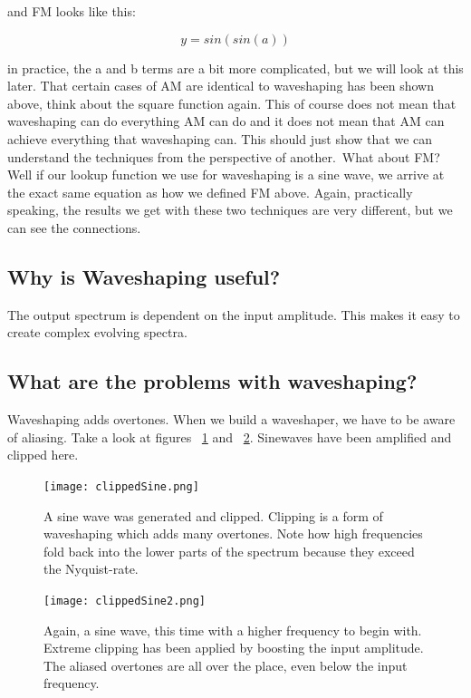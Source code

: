 and FM looks like this:

\begin{equation}
	y = sin(sin(a))
\end{equation}

in practice, the a and b terms are a bit more complicated, but we will look at this later. That certain cases of AM are identical to waveshaping has been shown above, think about the square function again.
This of course does not mean that waveshaping can do everything AM can do and it does not mean that AM can achieve everything that waveshaping can. This should just show that we can understand the techniques from the perspective of another.\
What about FM? Well if our lookup function we use for waveshaping is a sine wave, we arrive at the exact same equation as how we defined FM above. Again, practically speaking, the results we get with these two techniques are very different, but we can see the connections.


\subsection{Why is Waveshaping useful?}
The output spectrum is dependent on the input amplitude. This makes it easy to create complex evolving spectra.

\subsection{What are the problems with waveshaping?}

Waveshaping adds overtones. When we build a waveshaper, we have to be aware of aliasing. Take a look at figures ~\ref{fig:clipped1} and ~\ref{fig:clipped2}. Sinewaves have been amplified and clipped here.

\begin{figure}[h!]
	\centering
	\texttt{[image: clippedSine.png]}
	\caption[clipped sine wave]
	{A sine wave was generated and clipped. Clipping is a form of waveshaping which adds many overtones. Note how high frequencies fold back into the lower parts of the spectrum because they exceed the Nyquist-rate.}
	\label{fig:clipped1}
\end{figure}

\begin{figure}[h!]
	\centering
	\texttt{[image: clippedSine2.png]}
	\caption[clipped sine wave 2]
	{Again, a sine wave, this time with a higher frequency to begin with. Extreme clipping has been applied by boosting the input amplitude. The aliased overtones are all over the place, even below the input frequency.}
	\label{fig:clipped2}
\end{figure}


